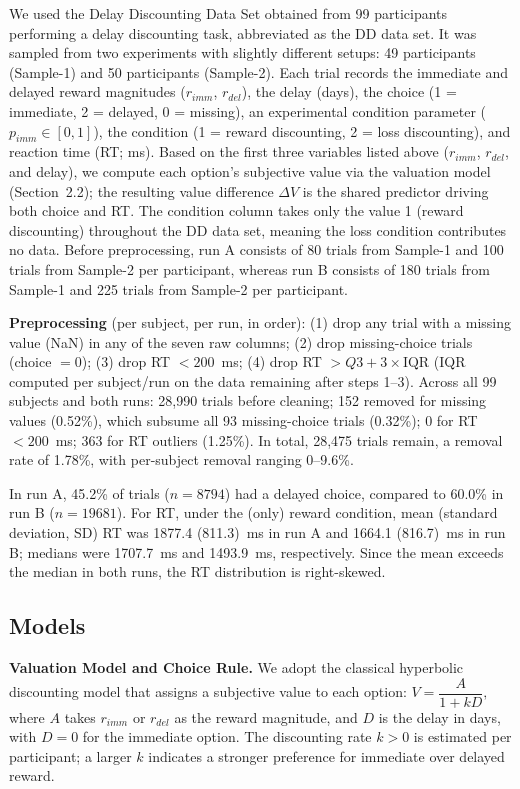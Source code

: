 \documentclass[11pt,a4paper]{article}
\begin{document}
	We used the Delay Discounting Data Set obtained from 99 participants performing a delay discounting task, abbreviated as the DD data set. It was sampled from two experiments with slightly different setups: 49 participants (Sample-1) and 50 participants (Sample-2). Each trial records the immediate and delayed reward magnitudes ($r_{imm}$, $r_{del}$), the delay (days), the choice (1 = immediate, 2 = delayed, 0 = missing), an experimental condition parameter ($p_{imm} \in [0,1]$), the condition (1 = reward discounting, 2 = loss discounting), and reaction time (RT; ms). Based on the first three variables listed above ($r_{imm}$, $r_{del}$, and delay), we compute each option's subjective value via the valuation model (Section~2.2); the resulting value difference $\Delta V$ is the shared predictor driving both choice and RT. The condition column takes only the value 1 (reward discounting) throughout the DD data set, meaning the loss condition contributes no data. Before preprocessing, run A consists of 80 trials from Sample-1 and 100 trials from Sample-2 per participant, whereas run B consists of 180 trials from Sample-1 and 225 trials from Sample-2 per participant.
	
	\textbf{Preprocessing} (per subject, per run, in order): (1) drop any trial with a missing value (NaN) in any of the seven raw columns; (2) drop missing-choice trials (choice $=0$); (3) drop RT $<200$~ms; (4) drop RT $>Q3+3\times\text{IQR}$ (IQR computed per subject/run on the data remaining after steps 1--3). Across all 99 subjects and both runs: 28{,}990 trials before cleaning; 152 removed for missing values (0.52\%), which subsume all 93 missing-choice trials (0.32\%); 0 for RT $<200$~ms; 363 for RT outliers (1.25\%). In total, 28{,}475 trials remain, a removal rate of 1.78\%, with per-subject removal ranging 0--9.6\%.
	
	In run A, 45.2\% of trials ($n=8794$) had a delayed choice, compared to 60.0\% in run B ($n=19681$). For RT, under the (only) reward condition, mean (standard deviation, SD) RT was 1877.4 (811.3)~ms in run A and 1664.1 (816.7)~ms in run B; medians were 1707.7~ms and 1493.9~ms, respectively. Since the mean exceeds the median in both runs, the RT distribution is right-skewed.
	
	\subsection{Models}
	
	\textbf{Valuation Model and Choice Rule. }We adopt the classical hyperbolic discounting model that assigns a subjective value to each option:
	$ V = \dfrac{A}{1+kD},$
	where $A$ takes $r_{imm}$ or $r_{del}$ as the reward magnitude, and $D$ is the delay in days, with $D=0$ for the immediate option. The discounting rate $k>0$ is estimated per participant; a larger $k$ indicates a stronger preference for immediate over delayed reward.
	
\end{document}
